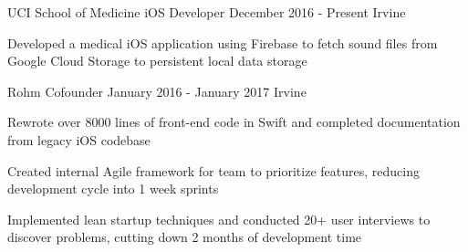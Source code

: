 \begin{cventries}
  \cventry
    {UCI School of Medicine} %
    {iOS Developer} %
    {December 2016 - Present} %
    {Irvine} %
    {
      \begin{cvitems} %
        \item Developed a medical iOS application using Firebase to fetch sound files from Google Cloud Storage to persistent local data storage
      \end{cvitems}
    }

  \cventry
    {Rohm} %
    {Cofounder} %
    {January 2016 - January 2017} %
    {Irvine} %
    {
      \begin{cvitems} %
        \item Rewrote over 8000 lines of front-end code in Swift and completed documentation from legacy iOS codebase
        \item Created internal Agile framework for team to prioritize features, reducing development cycle into 1 week sprints
        \item Implemented lean startup techniques and conducted 20+ user interviews to discover problems, cutting down 2 months of development time
      \end{cvitems}
    }

\end{cventries}
